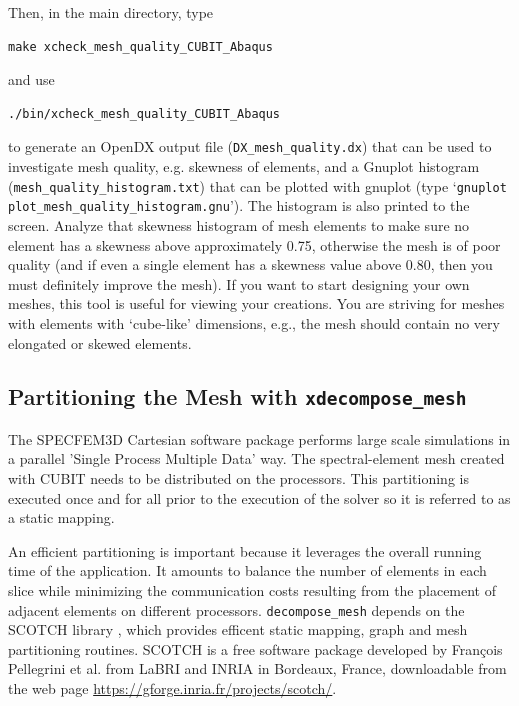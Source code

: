 \noindent
Then, in the main directory, type
{\small
\begin{verbatim}
make xcheck_mesh_quality_CUBIT_Abaqus
\end{verbatim}
}
and use
{\small
\begin{verbatim}
./bin/xcheck_mesh_quality_CUBIT_Abaqus
\end{verbatim}
}
to generate an %
OpenDX output file (\texttt{\small DX\_mesh\_quality.dx}{\small )
that can be used to investigate mesh quality, e.g. skewness of elements,
and a Gnuplot histogram (}\texttt{\small mesh\_quality\_histogram.txt}{\small )
that can be plotted with gnuplot (type `}\texttt{\small gnuplot plot\_mesh\_quality\_histogram.gnu}{\small ').
The histogram is also printed to the screen. Analyze that skewness
histogram of mesh elements to make sure no element has a skewness
above approximately 0.75, otherwise the mesh is of poor quality (and
if even a single element has a skewness value above 0.80, then you
must definitely improve the mesh). If you want to start designing
your own meshes, this tool is useful for viewing your creations. You
are striving for meshes with elements with `cube-like' dimensions,
e.g., the mesh should contain no very elongated or skewed elements.}{\small \par}


\subsection{Partitioning the Mesh with \texttt{xdecompose\_mesh}}

The SPECFEM3D Cartesian software package performs large scale simulations
in a parallel 'Single Process Multiple Data' way. The spectral-element
mesh created with CUBIT needs to be distributed on the processors.
This partitioning is executed once and for all prior to the execution
of the solver so it is referred to as a static mapping.

An efficient partitioning is important because it leverages the overall
running time of the application. It amounts to balance the number
of elements in each slice while minimizing the communication costs
resulting from the placement of adjacent elements on different processors.
\texttt{decompose\_mesh} depends on the SCOTCH library \citep{PeRo96},
which provides efficent static mapping, graph and mesh partitioning
routines. SCOTCH is a free software package developed by Fran\c{c}ois
Pellegrini et al. from LaBRI and INRIA in Bordeaux, France, downloadable
from the web page \url{https://gforge.inria.fr/projects/scotch/}.
\\


